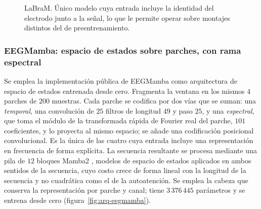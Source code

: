 \begin{figure}[H]
\centering
{}
\caption{LaBraM. Único modelo cuya entrada incluye la identidad del electrodo junto a la señal, lo
que le permite operar sobre montajes distintos del de preentrenamiento.}
\label{fig:arq-labram}
\end{figure}

\subsubsection{EEGMamba: espacio de estados sobre parches, con rama espectral}

Se emplea la implementación pública de EEGMamba \cite{wang2025eegmamba} como arquitectura de espacio de estados entrenada desde cero. Fragmenta la ventana en los mismos $4$
parches de $200$ muestras. Cada parche se codifica
por dos vías que se suman: una \emph{temporal}, una convolución de $25$ filtros de
longitud $49$ y paso $25$, y una
\emph{espectral}, que toma el módulo de la transformada rápida de Fourier real del parche,
$101$ coeficientes, y lo proyecta al mismo espacio; se añade una codificación posicional
convolucional. Es la única de las cuatro cuya entrada incluye
una representación en frecuencia de forma explícita. La secuencia resultante se procesa
mediante una pila de $12$ bloques Mamba2 \cite{gu2023mamba,dao2024mamba2}, modelos de
espacio de estados aplicados en ambos sentidos de la secuencia, cuyo
costo crece de forma lineal con la longitud de la secuencia y no cuadrática como el de la
autoatención. Se emplea la cabeza que conserva la representación por parche y canal;
tiene $3\,376\,445$ parámetros y se entrena desde cero
(figura~\ref{fig:arq-eegmamba}).

